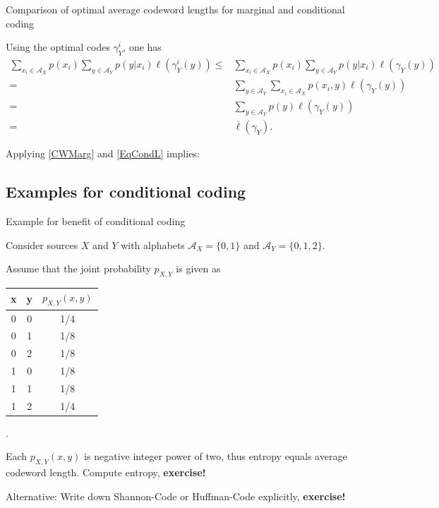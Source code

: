 \begin{frame}{Comparison of optimal average codeword lengths for marginal and conditional coding}
\bit
\item Using the optimal codes $\gamma_Y^{i}$, one has
\begin{align*}
\sum_{x_i\in\mathcal{A}_X}p(x_i)\sum_{y\in\mathcal{A}_Y}p(y|x_i)\ell(\gamma_Y^i(y))\leq& \sum_{x_i\in\mathcal{A}_X}p(x_i)\sum_{y\in\mathcal{A}_Y}p(y|x_i)\ell(\gamma_Y(y))
\\=&\sum_{y\in\mathcal{A}_Y}\sum_{x_i\in\mathcal{A}_X}p(x_i,y)\ell(\gamma_Y(y))
\\=& \sum_{y\in\mathcal{A}_Y}p(y)\ell(\gamma_Y(y))
\\=&\overline{\ell}(\gamma_Y).
\end{align*}
\item Applying \eqref{CWMarg} and \eqref{EqCondL} implies: 
\item [\iarrow] 
\eit
\end{frame} 


\subsection{Examples for conditional coding}

\begin{frame}{Example for benefit of conditional coding}
\bit
\item Consider sources $X$ and $Y$ with alphabets $\mathcal{A}_X=\{0,1\}$ and $\mathcal{A}_Y=\{0,1,2\}$. 
\item Assume that the joint probability $p_{X,Y}$ is given as
\begin{center} 
 \begin{tabular}[hbt!]{ |c|c|c| } 
 \hline
 x & y & $p_{X,Y}(x,y)$ \\
 \hline 
0 & 0 & 1/4\\  
0 & 1 & 1/8\\
0 & 2 &  1/8\\
1 & 0 & 1/8\\
1 & 1 &  1/8\\
1& 2& 1/4\\
 \hline
\end{tabular}.
\end{center}
\eit
\smallskip
\bit
\item Each $p_{X,Y}(x,y)$ is negative 
integer power of two, thus entropy equals average codeword length. Compute entropy, \textbf{exercise!}
\item Alternative: Write down Shannon-Code or Huffman-Code explicitly, \textbf{exercise!}
\eit
\end{frame}

